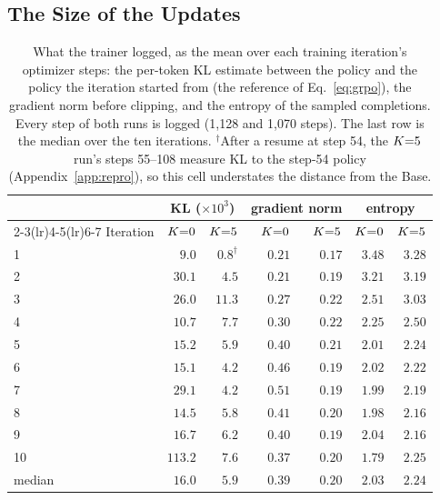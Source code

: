 \subsection{The Size of the Updates}
\label{app:trainer}

\begin{table}[t]
\centering
\footnotesize
\setlength{\tabcolsep}{4pt}
\begin{tabular}{lrrrrrr}
\toprule
& \multicolumn{2}{c}{KL ($\times 10^{3}$)} & \multicolumn{2}{c}{gradient norm} & \multicolumn{2}{c}{entropy}\\
\cmidrule(lr){2-3}\cmidrule(lr){4-5}\cmidrule(lr){6-7}
Iteration & $K{=}0$ & $K{=}5$ & $K{=}0$ & $K{=}5$ & $K{=}0$ & $K{=}5$\\
\midrule
1 & $9.0$ & $0.8^{\dagger}$ & $0.21$ & $0.17$ & $3.48$ & $3.28$\\
2 & $30.1$ & $4.5$ & $0.21$ & $0.19$ & $3.21$ & $3.19$\\
3 & $26.0$ & $11.3$ & $0.27$ & $0.22$ & $2.51$ & $3.03$\\
4 & $10.7$ & $7.7$ & $0.30$ & $0.22$ & $2.25$ & $2.50$\\
5 & $15.2$ & $5.9$ & $0.40$ & $0.21$ & $2.01$ & $2.24$\\
6 & $15.1$ & $4.2$ & $0.46$ & $0.19$ & $2.02$ & $2.22$\\
7 & $29.1$ & $4.2$ & $0.51$ & $0.19$ & $1.99$ & $2.19$\\
8 & $14.5$ & $5.8$ & $0.41$ & $0.20$ & $1.98$ & $2.16$\\
9 & $16.7$ & $6.2$ & $0.40$ & $0.19$ & $2.04$ & $2.16$\\
10 & $113.2$ & $7.6$ & $0.37$ & $0.20$ & $1.79$ & $2.25$\\
\midrule
median & $16.0$ & $5.9$ & $0.39$ & $0.20$ & $2.03$ & $2.24$\\
\bottomrule
\end{tabular}
\caption{What the trainer logged, as the mean over each training iteration's optimizer steps:
the per-token KL estimate between the policy and the policy the iteration started from (the
reference of Eq.~\ref{eq:grpo}), the gradient norm before clipping, and the entropy of the sampled
completions. Every step of both runs is logged (1{,}128 and 1{,}070 steps). The last row is the
median over the ten iterations. $^{\dagger}$After a resume at step 54, the $K{=}5$ run's steps 55--108
measure KL to the step-54 policy (Appendix~\ref{app:repro}), so this cell understates the distance
from the Base.}
\label{tab:trainer}
\end{table}

